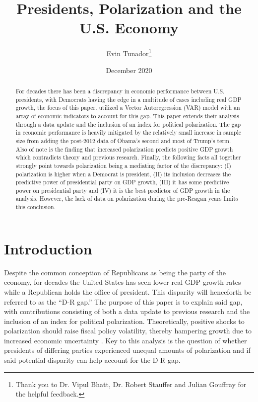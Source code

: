 \documentclass[a4paper, 12pt]{article}
\begin{document}
\title{Presidents, Polarization and the U.S. Economy}
\author{Evin Tunador\thanks{Thank you to Dr. Vipul Bhatt, Dr. Robert Stauffer and Julian Gouffray  for the helpful feedback.}}
\date{December 2020}

\maketitle



\begin{abstract}
    For decades there has been a discrepancy in economic performance between U.S. presidents, with Democrats having the edge in a multitude of cases including real GDP growth, the focus of this paper.  utilized a Vector Autoregression (VAR) model with an array of economic indicators to account for this gap. This paper extends their analysis through a data update and the inclusion of an index for political polarization. The gap in economic performance is heavily mitigated by the relatively small increase in sample size from adding the post-2012 data of Obama’s second and most of Trump’s term. Also of note is the finding that increased polarization predicts positive GDP growth which contradicts theory and previous research. Finally, the following facts all together strongly point towards polarization being a mediating factor of the discrepancy: (I) polarization is higher when a Democrat is president, (II) its inclusion decreases the predictive power of presidential party on GDP growth, (III) it has some predictive power on presidential party and (IV) it is the best predictor of GDP growth in the analysis. However, the lack of data on polarization during the pre-Reagan years limits this conclusion.
\end{abstract}


\newpage
\section{Introduction}
\setlength{\parindent}{7ex}
Despite the common conception of Republicans as being the party of the economy, for decades the United States has seen lower real GDP growth rates while a Republican holds the office of president. This disparity will henceforth be referred to as the “D-R gap.” The purpose of this paper is to explain said gap, with contributions consisting of both a data update to previous research and the inclusion of an index for political polarization. Theoretically, positive shocks to polarization should raise fiscal policy volatility, thereby hampering growth due to increased economic uncertainty \cite{azzimontiTalbert2014, bakerBloomDavis2016}. Key to this analysis is the question of whether presidents of differing parties experienced unequal amounts of polarization and if said potential disparity can help account for the D-R gap. \par 
\end{document}
